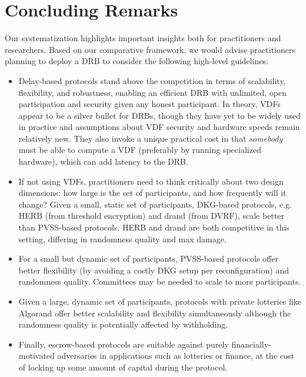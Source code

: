 
\section{Concluding Remarks}
\label{section:conclusion}
Our systematization highlights important insights both for practitioners and researchers. 
Based on our comparative framework, we would advise practitioners planning to deploy a DRB to consider the following high-level guidelines:
\begin{itemize}
    \item Delay-based protocols stand above the competition in terms of scalability, flexibility, and robustness, enabling an efficient DRB with unlimited, open participation and security given any honest participant. In theory, VDFs appear to be a silver bullet for DRBs, though they have yet to be widely used in practice and assumptions about VDF security and hardware speeds remain relatively new. They also invoke a unique practical cost in that \emph{somebody} must be able to compute a VDF (preferably by running specialized hardware), which can add latency to the DRB.
    \item If not using VDFs, practitioners need to think critically about two design dimensions: how large is the set of participants, and how frequently will it change? Given a small, static set of participants, DKG-based protocols, e.g. HERB (from threshold encryption) and drand (from DVRF), scale better than PVSS-based protocols. HERB and drand are both competitive in this setting, differing in randomness quality and max damage.
    \item For a small but dynamic set of participants, PVSS-based protocols offer better flexibility (by avoiding a costly DKG setup per reconfiguration) and randomness quality. Committees may be needed to scale to more participants.
    \item Given a large, dynamic set of participants, protocols with private lotteries like Algorand offer better scalability and flexibility simultaneously although the randomness quality is potentially affected by withholding.
    \item Finally, escrow-based protocols are suitable against purely financially-motivated adversaries in applications such as lotteries or finance, at the cost of locking up some amount of capital during the protocol.
\end{itemize}

